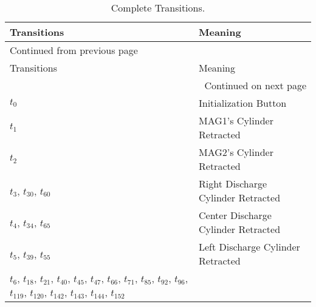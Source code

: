 \begin{longtable}{m{5cm}m{5cm}}
\caption{Complete Transitions.}
\\
Transitions & Meaning\\
\hline
\endfirsthead
\multicolumn{2}{l}{Continued from previous page} \\
\hline

Transitions & Meaning \\

\hline
\endhead
\hline\multicolumn{2}{r}{Continued on next page} \\
\endfoot
\endlastfoot
\hline
\hyperlink{completeNet:t0}{\hypertarget{completeTable:t0}{$t_{0}$}} & Initialization Button\\
\hyperlink{completeNet:t1}{\hypertarget{completeTable:t1}{$t_{1}$}} & MAG1's Cylinder Retracted\\
\hyperlink{completeNet:t2}{\hypertarget{completeTable:t2}{$t_{2}$}} & MAG2's Cylinder Retracted\\
\hyperlink{completeNet:t3}{\hypertarget{completeTable:t3}{$t_{3}$}}, \hyperlink{completeNet:t30}{\hypertarget{completeTable:t30}{$t_{30}$}}, \hyperlink{completeNet:t60}{\hypertarget{completeTable:t60}{$t_{60}$}} & Right Discharge Cylinder Retracted\\
\hyperlink{completeNet:t4}{\hypertarget{completeTable:t4}{$t_{4}$}}, \hyperlink{completeNet:t34}{\hypertarget{completeTable:t34}{$t_{34}$}}, \hyperlink{completeNet:t65}{\hypertarget{completeTable:t65}{$t_{65}$}} & Center Discharge Cylinder Retracted\\
\hyperlink{completeNet:t5}{\hypertarget{completeTable:t5}{$t_{5}$}}, \hyperlink{completeNet:t39}{\hypertarget{completeTable:t39}{$t_{39}$}}, \hyperlink{completeNet:t55}{\hypertarget{completeTable:t55}{$t_{55}$}} & Left Discharge Cylinder Retracted\\
\hyperlink{completeNet:t6}{\hypertarget{completeTable:t6}{$t_{6}$}}, \hyperlink{completeNet:t18}{\hypertarget{completeTable:t18}{$t_{18}$}}, \hyperlink{completeNet:t21}{\hypertarget{completeTable:t21}{$t_{21}$}}, \hyperlink{completeNet:t40}{\hypertarget{completeTable:t40}{$t_{40}$}}, \hyperlink{completeNet:t45}{\hypertarget{completeTable:t45}{$t_{45}$}}, \hyperlink{completeNet:t47}{\hypertarget{completeTable:t47}{$t_{47}$}}, \hyperlink{completeNet:t66}{\hypertarget{completeTable:t66}{$t_{66}$}}, \hyperlink{completeNet:t71}{\hypertarget{completeTable:t71}{$t_{71}$}}, \hyperlink{completeNet:t85}{\hypertarget{completeTable:t85}{$t_{85}$}}, \hyperlink{completeNet:t92}{\hypertarget{completeTable:t92}{$t_{92}$}}, \hyperlink{completeNet:t96}{\hypertarget{completeTable:t96}{$t_{96}$}}, \hyperlink{completeNet:t119}{\hypertarget{completeTable:t119}{$t_{119}$}}, \hyperlink{completeNet:t120}{\hypertarget{completeTable:t120}{$t_{120}$}}, \hyperlink{completeNet:t142}{\hypertarget{completeTable:t142}{$t_{142}$}}, \hyperlink{completeNet:t143}{\hypertarget{completeTable:t143}{$t_{143}$}}, \hyperlink{completeNet:t144}{\hypertarget{completeTable:t144}{$t_{144}$}}, \hyperlink{completeNet:t152}{\hypertarget{completeTable:t152}{$t_{152}$}} & \\

\end{longtable}
